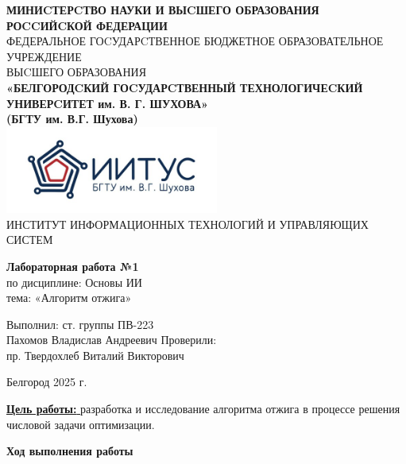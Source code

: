 \documentclass[a4paper,14pt]{extarticle}
\newcommand\textbox[1]{
	\parbox{.45\textwidth}{#1}
}
\begin{document}
\begin{center}
    \small{
        \textbf{МИНИCТЕРCТВО НАУКИ И ВЫCШЕГО ОБРАЗОВАНИЯ РОCCИЙCКОЙ ФЕДЕРАЦИИ}\\
        ФЕДЕРАЛЬНОЕ ГОCУДАРCТВЕННОЕ БЮДЖЕТНОЕ ОБРАЗОВАТЕЛЬНОЕ УЧРЕЖДЕНИЕ\\ВЫCШЕГО ОБРАЗОВАНИЯ \\
        \textbf{«БЕЛГОРОДCКИЙ ГОCУДАРCТВЕННЫЙ ТЕХНОЛОГИЧЕCКИЙ\\УНИВЕРCИТЕТ им. В. Г. ШУХОВА»\\ (БГТУ им. В.Г. Шухова)} \\
        \bigbreak
        \includegraphics[width=70mm]{log}\\
        ИНСТИТУТ ИНФОРМАЦИОННЫХ ТЕХНОЛОГИЙ И УПРАВЛЯЮЩИХ СИСТЕМ\\}
\end{center}

\vfill
\begin{center}
    \large{
        \textbf{
            Лабораторная работа №1}}\\
    \normalsize{
        по дисциплине: Основы ИИ \\
        тема: «Алгоритм отжига»}
\end{center}
\vfill
\hfill\textbox{
    Выполнил: ст. группы ПВ-223\\Пахомов Владислав Андреевич
    \bigbreak
    Проверили: \\пр. Твердохлеб Виталий Викторович
}
\vfill\begin{center}
    Белгород 2025 г.
\end{center}
\newpage
\underline{\textbf{Цель работы: }}разработка и исследование алгоритма отжига в процессе
решения числовой задачи оптимизации.\\
\begin{center}
\textbf{Ход выполнения работы}
\end{center}
\end{document}
